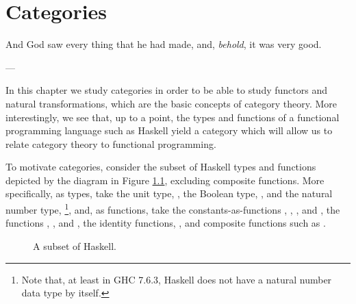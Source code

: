 \chapter{Categories}
\label{chap:categories}

\epigraph{
  And God saw every thing that he had made, and, \emph{behold}, it was
  very good.
}{---\textcite[Genesis 1:31]{god-1769}}

In this chapter we study categories in order to be able to study
functors and natural transformations, which are the basic concepts of
category theory. More interestingly, we see that, up to a point, the
types and functions of a functional programming language such as
Haskell yield a category which will allow us to relate category theory
to functional programming.

To motivate categories, consider the subset of Haskell types and
functions depicted by the diagram in Figure
\ref{fig:category-haskell}, excluding composite functions. More
specifically, as types, take the unit type, \texthaskell{()}, the
Boolean type, , and the natural number type,
\footnote{Note that, at least in GHC 7.6.3, Haskell
  does not have a natural number data type by itself.}, and, as
functions, take the constants-as-functions \texthaskell{()},
, , and , the
functions , , and
, the identity functions, , and
composite functions such as .

\begin{figure}[htb]
  \begin{center}
  \end{center}
  \caption{A subset of Haskell.}
  \label{fig:category-haskell}
\end{figure}


